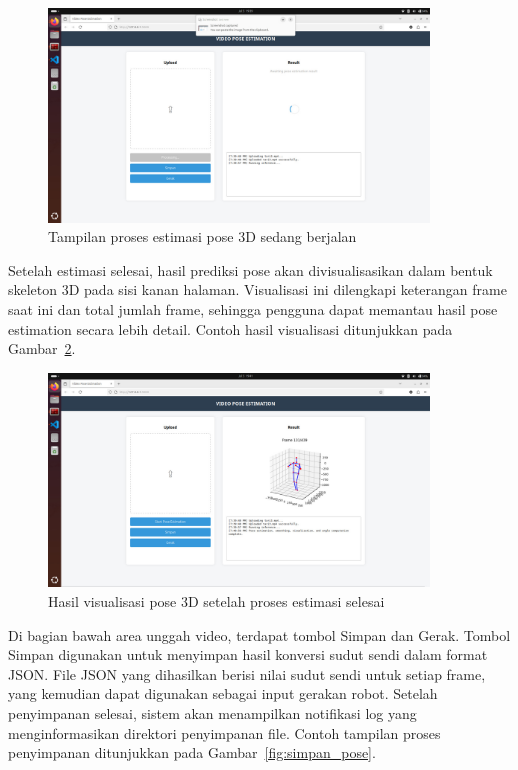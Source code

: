 \begin{figure}[H]
    \centering
    \includegraphics[width=0.9\textwidth]{images/tampilan4.jpeg}
    \caption{Tampilan proses estimasi pose 3D sedang berjalan}
    \label{fig:proses_estimasi_pose}
\end{figure}

Setelah estimasi selesai, hasil prediksi pose akan divisualisasikan dalam bentuk skeleton 3D pada sisi kanan halaman. Visualisasi ini dilengkapi keterangan frame saat ini dan total jumlah frame, sehingga pengguna dapat memantau hasil pose estimation secara lebih detail. Contoh hasil visualisasi ditunjukkan pada Gambar~\ref{fig:hasil_estimasi_pose}.

\begin{figure}[H]
    \centering
    \includegraphics[width=0.9\textwidth]{images/tampilan5.jpeg}
    \caption{Hasil visualisasi pose 3D setelah proses estimasi selesai}
    \label{fig:hasil_estimasi_pose}
\end{figure}

Di bagian bawah area unggah video, terdapat tombol Simpan dan Gerak. Tombol Simpan digunakan untuk menyimpan hasil konversi sudut sendi dalam format JSON. File JSON yang dihasilkan berisi nilai sudut sendi untuk setiap frame, yang kemudian dapat digunakan sebagai input gerakan robot. Setelah penyimpanan selesai, sistem akan menampilkan notifikasi log yang menginformasikan direktori penyimpanan file. Contoh tampilan proses penyimpanan ditunjukkan pada Gambar~\ref{fig:simpan_pose}.

